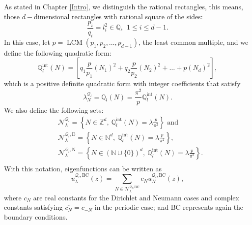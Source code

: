 \documentclass{amsart}
\theoremstyle{definition}
\theoremstyle{remark}
\renewcommand\leq\leqslant
\numberwithin{equation}{section}
\theoremstyle{definition}
\theoremstyle{remark}
\DeclareMathOperator\LCM{LCM}
\begin{document}
As stated in Chapter \ref{Intro}, we distinguish the rational rectangles, this means,  those $d-$dimensional rectangles with rational square of the sides:  \begin{equation}
	\frac{p_i}{q_i}=l_i^2\in\mathbb{Q}, \ \ 1\leq i\leq d-1.
\end{equation}
In this case, let $p=\LCM(p_1,p_2,\ldots,p_{d-1})$, the least common multiple, and we define the following quadratic form: 
\begin{equation}		\mathbb{Q}^{\mathrm{int}}_l(N)=\left[q_{1}\frac{p}{p_{1}}(N_1)^2+q_{2}\frac{p}{p_2}\left(N_2\right)^2+\ldots+p\left(N_d\right)^2\right],
\end{equation}which is a positive definite quadratic form  with integer coefficients that satisfy \begin{equation}
	\lambda_{N}^{\mathcal{Q}_l}=\mathbb{Q}_l(N)=\frac{\pi^2}{p}\mathbb{Q}^{\mathrm{int}}_l(N).
\end{equation}We also define the following sets:
\begin{equation}
	\begin{aligned}
		&\mathcal{N}_\lambda^{\mathcal{Q}_l}=\left\{N\in\mathbb{Z}^d,\ \mathbb{Q}^{\mathrm{int}}_l(N)=\lambda\frac{p}{\pi^2}\right\}\text{ and }\\
		&\mathcal{N}_\lambda^{\mathcal{Q}_l,\mathrm{D}}=\left\{N\in\mathbb{N}^d,\ \mathbb{Q}^{\mathrm{int}}_l(N)=\lambda\frac{p}{\pi^2}\right\},\\
		&\mathcal{N}_\lambda^{\mathcal{Q}_l,\mathrm{N}}=\left\{N\in\left(\mathbb{N}\cup\{0\}\right)^d,\ \mathbb{Q}^{\mathrm{int}}_l(N)=\lambda\frac{p}{\pi^2}\right\}.\\
	\end{aligned}
\end{equation}
With this notation, eigenfunctions can be written as
\begin{equation}
u_{\lambda}^{\mathcal{Q}_l,\mathrm{BC}}(z)=\sum_{N\in\mathcal{N}_\lambda^{\mathcal{Q}_l,\mathrm{BC}}}c_Nu_{N}^{\mathcal{Q}_l,\mathrm{BC}}(z),
\end{equation}where $c_N$ are real constants for the Dirichlet and Neumann cases and complex constants satisfying $\overline{c_{N}}=c_{-N}$ in the periodic case; and $\mathrm{BC}$ represents again the boundary conditions.
\end{document}
